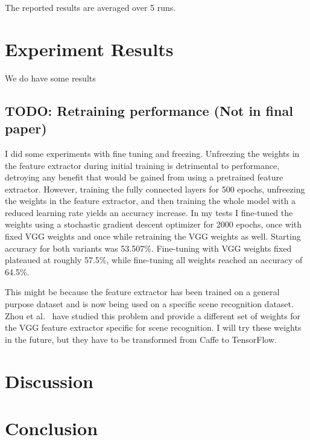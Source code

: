 \documentclass[11pt,twocolumn]{article}
\newcommand{\tf}{TensorFlow}
\begin{document}
The reported results are averaged over 5 runs.

\section{Experiment Results}
\label{sec:results}

We do have some results

\subsection{TODO: Retraining performance (Not in final paper)}

I did some experiments with fine tuning and freezing.
Unfreezing the weights in the feature extractor during initial training is detrimental to performance, detroying any benefit that would be gained from using a pretrained feature extractor.
However, training the fully connected layers for 500 epochs, unfreezing the weights in the feature extractor, and then training the whole model with a reduced learning rate yields an accuracy increase.
In my tests I fine-tuned the weights using a stochastic gradient descent optimizer for 2000 epochs, once with fixed VGG weights and once while retraining the VGG weights as well.
Starting accuracy for both variants was 53.507\%.
Fine-tuning with VGG weights fixed plateaued at roughly 57.5\%, while fine-tuning all weights reached an accuracy of 64.5\%.

This might be because the feature extractor has been trained on a general purpose dataset and is now being used on a specific scene recognition dataset.
Zhou et al.~\cite{zhou_learning_2014} have studied this problem and provide a different set of weights for the VGG feature extractor specific for scene recognition.
I will try these weights in the future, but they have to be transformed from Caffe to \tf{}.

\section{Discussion}
\label{sec:discussion}

\section{Conclusion}
\label{sec:conclusion}



\end{document}
